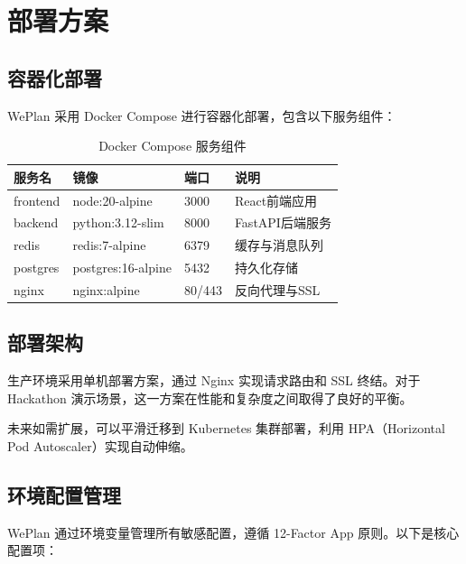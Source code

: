 \documentclass[12pt,a4paper]{ctexart}
\begin{document}
\newpage

\section{部署方案}

\subsection{容器化部署}

WePlan 采用 Docker Compose 进行容器化部署，包含以下服务组件：

\begin{table}[H]
\centering
\caption{Docker Compose 服务组件}
\label{tab:docker-services}
\renewcommand{\arraystretch}{1.3}
\begin{tabular}{p{3cm} p{3cm} p{2cm} p{4cm}}
\toprule
\textbf{服务名} & \textbf{镜像} & \textbf{端口} & \textbf{说明} \\
\midrule
frontend & node:20-alpine & 3000 & React前端应用 \\
backend & python:3.12-slim & 8000 & FastAPI后端服务 \\
redis & redis:7-alpine & 6379 & 缓存与消息队列 \\
postgres & postgres:16-alpine & 5432 & 持久化存储 \\
nginx & nginx:alpine & 80/443 & 反向代理与SSL \\
\bottomrule
\end{tabular}
\end{table}

\subsection{部署架构}

生产环境采用单机部署方案，通过 Nginx 实现请求路由和 SSL 终结。对于 Hackathon 演示场景，这一方案在性能和复杂度之间取得了良好的平衡。

未来如需扩展，可以平滑迁移到 Kubernetes 集群部署，利用 HPA（Horizontal Pod Autoscaler）实现自动伸缩。

\subsection{环境配置管理}

WePlan 通过环境变量管理所有敏感配置，遵循 12-Factor App 原则。以下是核心配置项：
\end{document}
